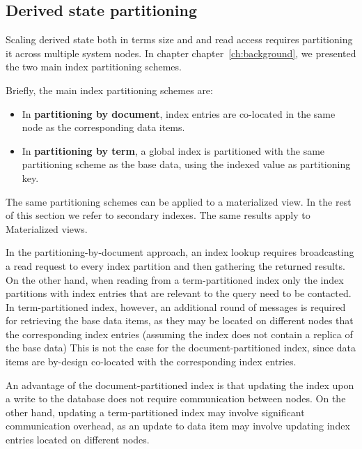 \subsection{Derived state partitioning}
\label{sec:index_partitioning}


Scaling derived state both in terms size and and read access requires partitioning it across multiple system nodes.
In chapter chapter~\ref{ch:background}, we presented the two main index partitioning schemes.

Briefly, the main index partitioning schemes are:
\begin{itemize}

  \item In \textbf{partitioning by document}, index entries are co-located in the same node as the corresponding
  data items.

  \item In \textbf{partitioning by term}, a global index is partitioned with the same partitioning scheme as the base data,
  using the indexed value as partitioning key.

\end{itemize}

The same partitioning schemes can be applied to a materialized view.
In the rest of this section we refer to secondary indexes.
The same results apply to Materialized views.

\medskip

In the partitioning-by-document approach, an index lookup requires broadcasting a read request to every index partition
and then gathering the returned results.
On the other hand, when reading from a term-partitioned index only the index partitions with index entries that are
relevant to the query need to be contacted.
In term-partitioned index, however, an additional round of messages is required for retrieving the base data items,
as they may be located on different nodes that the corresponding index entries (assuming the index does not contain a
replica of the base data)
This is not the case for the document-partitioned index, since data items are by-design co-located with the corresponding
index entries.

An advantage of the document-partitioned index is that updating the index upon a write to the database does not require
communication between nodes.
On the other hand, updating a term-partitioned index may involve significant communication overhead, as an update to data
item may involve updating index entries located on different nodes.

